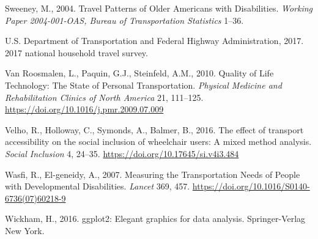 \documentclass[3p, authoryear, review]{elsarticle} %
\newlength{\cslhangindent}
\newenvironment{CSLReferences}[2] %
 {%
  \setlength{\parindent}{0pt}
  \ifodd #1 \everypar{\setlength{\hangindent}{\cslhangindent}}\ignorespaces\fi
  \ifnum #2 > 0
  \setlength{\parskip}{#2\baselineskip}
  \fi
 }%
 {}
\begin{document}
\begin{CSLReferences}{1}{0}
\leavevmode{}%
Sweeney, M., 2004. {Travel Patterns of Older Americans with Disabilities}. \emph{Working Paper 2004-001-OAS, Bureau of Transportation Statistics} 1--36.

\leavevmode{}%
U.S. Department of Transportation and Federal Highway Administration, 2017. 2017 national household travel survey.

\leavevmode{}%
Van Roosmalen, L., Paquin, G.J., Steinfeld, A.M., 2010. {Quality of Life Technology: The State of Personal Transportation}. \emph{Physical Medicine and Rehabilitation Clinics of North America} 21, 111--125. \url{https://doi.org/10.1016/j.pmr.2009.07.009}

\leavevmode{}%
Velho, R., Holloway, C., Symonds, A., Balmer, B., 2016. {The effect of transport accessibility on the social inclusion of wheelchair users: A mixed method analysis}. \emph{Social Inclusion} 4, 24--35. \url{https://doi.org/10.17645/si.v4i3.484}

\leavevmode{}%
Wasfi, R., El-geneidy, A., 2007. {Measuring the Transportation Needs of People with Developmental Disabilities}. \emph{Lancet} 369, 457. \url{https://doi.org/10.1016/S0140-6736(07)60218-9}

\leavevmode{}%
Wickham, H., 2016. ggplot2: Elegant graphics for data analysis. Springer-Verlag New York.

\end{CSLReferences}
\end{document}
